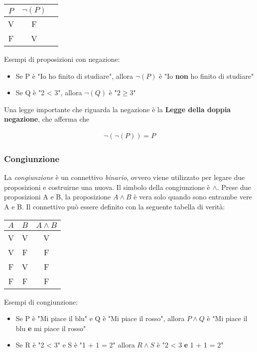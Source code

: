 \documentclass{article}
\begin{document}
\vspace{0.3cm}
\begin{center}
  \begin{tabular}{|c|c|c|}
    \hline
    $P$ & $\neg(P)$ \\
    \hline
    V & F \\
    \hline
    F & V \\
    \hline
  \end{tabular}
\end{center}
Esempi di proposizioni con negazione: 
\begin{itemize}[itemsep=0.05mm]
  \item Se P è "Io ho finito di studiare", allora $\neg(P)$ è "Io \textbf{non} ho finito di studiare"
  \item Se Q è "2 < 3", allora $\neg(Q)$ è "$2 \geq 3$"
\end{itemize}
Una legge importante che riguarda la negazione è la \textbf{Legge della doppia negazione},
che afferma che 

\begin{center}
  \begin{align}
    \neg(\neg(P)) = P \label{1}
  \end{align}
\end{center}

\subsubsection{Congiunzione}
La \textit{congiunzione} è un connettivo \textit{binario}, ovvero viene utilizzato per
legare due proposizioni e costruirne una nuova. Il simbolo della congiunzione è $\land$. 
Prese due proposizioni A e B, la proposizione $A \land B$ è vera solo quando sono 
entrambe vere A e B. Il connettivo può essere definito con la seguente tabella di verità: 
\vspace{0.3cm}
\begin{center}
  \begin{tabular}{|c|c|c|}
    \hline
    $A$ & $B$ & $A \land B$ \\
    \hline
    V & V & V \\
    \hline
    V & F & F \\
    \hline
    F & V & F \\
    \hline
    F & F & F \\
    \hline
  \end{tabular}
\end{center}
\vspace{0.2cm}
Esempi di congiunzione: 
\begin{itemize}[itemsep=0.05mm]
  \item Se P è "Mi piace il blu" e Q è "Mi piace il rosso", allora $P \land Q$ è "Mi piace il blu \textbf{e} mi piace il rosso"
  \item Se R è "2 < 3" e S è "1 + 1 = 2" allora $R \land S$ è "2 < 3 \textbf{e} 1 + 1 = 2"
\end{itemize}
\end{document}
